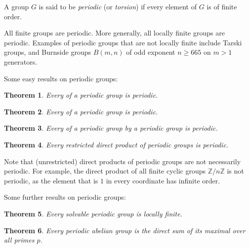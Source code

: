 \documentclass[12pt]{article}
\newtheorem{theorem}{Theorem}
\def\Z{\mathbb{Z}}
\begin{document}

A group $G$ is said to be \emph{periodic} (or \emph{torsion})
if every element of $G$ is of finite order.

All finite groups are periodic.
More generally, all locally finite groups are periodic.
Examples of periodic groups that are not locally finite include Tarski groups,
and Burnside groups $B(m,n)$ of odd exponent $n\ge665$ on $m>1$ generators.

Some easy results on periodic groups:

\begin{theorem}
\item Every  of a periodic group is periodic.
\end{theorem}

\begin{theorem}
\item Every  of a periodic group is periodic.
\end{theorem}

\begin{theorem}
\item Every  of a periodic group by a periodic group is periodic.
\end{theorem}

\begin{theorem}
\item Every restricted direct product of periodic groups is periodic.
\end{theorem}

Note that (unrestricted) direct products of periodic groups are not necessarily periodic. For example, the direct product of all finite cyclic groups $\Z/n\Z$ is not periodic, as the element that is $1$ in every coordinate has infinite order.

Some further results on periodic groups:

\begin{theorem}
Every solvable periodic group is locally finite.
\end{theorem}

\begin{theorem}
Every periodic abelian group is the direct sum of its maximal  over all primes $p$.
\end{theorem}
\end{document}
